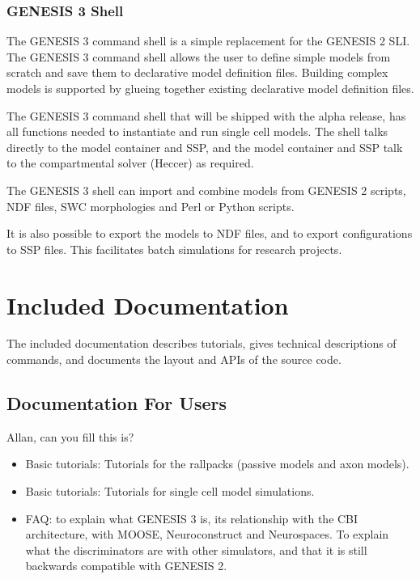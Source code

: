 \documentclass[12pt]{article}
\begin{document}
\subsubsection{GENESIS 3 Shell}

The GENESIS 3 command shell is a simple replacement for the GENESIS 2
SLI.  The GENESIS 3 command shell allows the user to define simple
models from scratch and save them to declarative model definition
files.  Building complex models is supported by glueing together
existing declarative model definition files.

The GENESIS 3 command shell that will be shipped with the alpha
release, has all functions needed to instantiate and run single cell
models.  The shell talks directly to the model container and SSP, and
the model container and SSP talk to the compartmental solver (Heccer)
as required.

The GENESIS 3 shell can import and combine models from GENESIS 2
scripts, NDF files, SWC morphologies and Perl or Python scripts.

It is also possible to export the models to NDF files, and to export
configurations to SSP files.  This facilitates batch simulations for
research projects.


\section{Included Documentation}

The included documentation describes tutorials, gives technical
descriptions of commands, and documents the layout and APIs of the
source code.


\subsection{Documentation For Users}

Allan, can you fill this is?

\begin{itemize}
\item Basic tutorials: Tutorials for the rallpacks (passive models and
  axon models).
\item Basic tutorials: Tutorials for single cell model simulations.
\item FAQ: to explain what GENESIS 3 is, its relationship with the CBI
  architecture, with MOOSE, Neuroconstruct and Neurospaces.  To
  explain what the discriminators are with other simulators, and that
  it is still backwards compatible with GENESIS 2.
\end{itemize}
\end{document}
